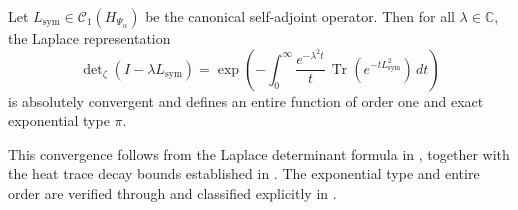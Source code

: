 \begin{lemma}
\label{lem:laplace_heat_trace_convergence}
Let \( L_{\mathrm{sym}} \in \mathcal{C}_1(H_{\Psi_\alpha}) \) be the canonical self-adjoint operator. Then for all \( \lambda \in \mathbb{C} \), the Laplace representation
\begin{equation}
\label{eq:laplace_heat_trace_representation}
\det\nolimits_\zeta(I - \lambda L_{\mathrm{sym}}) = \exp\left( - \int_0^\infty \frac{e^{-\lambda^2 t}}{t} \, \operatorname{Tr}(e^{-t L_{\mathrm{sym}}^2}) \, dt \right)
\end{equation}
is absolutely convergent and defines an entire function of order one and exact exponential type \( \pi \).

\medskip
\noindent
This convergence follows from the Laplace determinant formula in , together with the heat trace decay bounds established in . The exponential type and entire order are verified through  and classified explicitly in .
\end{lemma}
